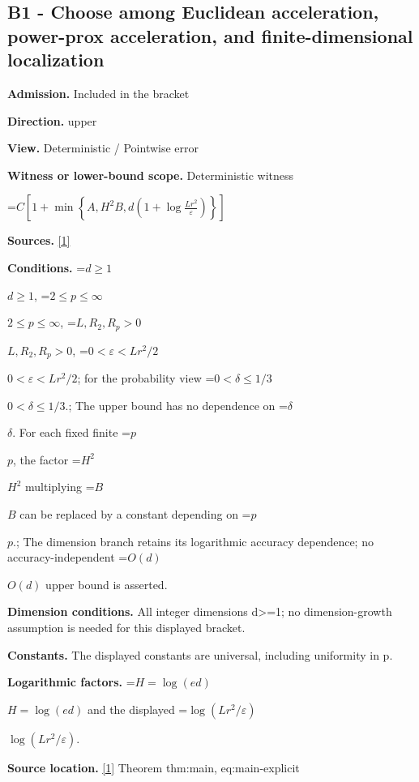 \documentclass[10pt,a4paper]{article}
\newcommand{\AtlasMath}[1]{\par\begingroup\centering\setbox0=\hbox{$\displaystyle #1$}\ifdim\wd0>1.4\linewidth\typeout{ATLAS WIDE FORMULA: \the\wd0}\fi\ifdim\wd0>\linewidth\resizebox{\linewidth}{!}{\box0}\else\box0\fi\par\endgroup}
\newcommand{\AtlasInlineMath}[1]{\begingroup\setbox0=\hbox{$#1$}\ifdim\wd0>.4\linewidth\endgroup\AtlasMath{#1}\else\endgroup$#1$\fi}
\begin{document}
\subsection{B1 - Choose among Euclidean acceleration, power-prox acceleration, and finite-dimensional localization}


\textbf{Admission.} Included in the bracket



\textbf{Direction.} upper



\textbf{View.} Deterministic / Pointwise error



\textbf{Witness or lower-bound scope.} Deterministic witness



\AtlasMath{C\left[1+\min\left\{A,H^2B,d\left(1+\log\frac{Lr^2}{\varepsilon}\right)\right\}\right]}


\textbf{Sources.} \href{https://github.com/WU-Wendao/Colombo/blob/main/colombo_sensorium/Complexity_altas/data/sources/colombo/U02/manuscript.pdf}{[1]}



\textbf{Conditions.} \AtlasInlineMath{d\ge1}, \AtlasInlineMath{2\le p\le\infty}, \AtlasInlineMath{L,R_2,R_p>0}, \AtlasInlineMath{0<\varepsilon<Lr^2/2}; for the probability view \AtlasInlineMath{0<\delta\le1/3}.; The upper bound has no dependence on \AtlasInlineMath{\delta}. For each fixed finite \AtlasInlineMath{p}, the factor \AtlasInlineMath{H^2} multiplying \AtlasInlineMath{B} can be replaced by a constant depending on \AtlasInlineMath{p}.; The dimension branch retains its logarithmic accuracy dependence; no accuracy-independent \AtlasInlineMath{O(d)} upper bound is asserted.



\textbf{Dimension conditions.} All integer dimensions d>=1; no dimension-growth assumption is needed for this displayed bracket.



\textbf{Constants.} The displayed constants are universal, including uniformity in p.



\textbf{Logarithmic factors.} \AtlasInlineMath{H=\log(ed)} and the displayed \AtlasInlineMath{\log(Lr^2/\varepsilon)}.



\textbf{Source location.} \href{https://github.com/WU-Wendao/Colombo/blob/main/colombo_sensorium/Complexity_altas/data/sources/colombo/U02/manuscript.pdf}{[1]} Theorem thm:main, eq:main-explicit
\end{document}
